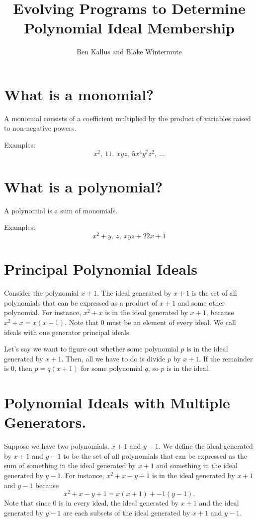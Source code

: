 \documentclass[20pt]{extarticle}
\title{Evolving Programs to Determine Polynomial Ideal Membership}
\author{Ben Kallus and Blake Wintermute}
\date{ }
\begin{document}
\pagecolor{black}
\color{white}
\maketitle

\newpage
\section*{What is a monomial?}

    A monomial consists of a coefficient multiplied by the product of variables raised to non-negative powers.

    Examples: $$x^2,~ 11,~ xyz,~ 5x^4y^7z^2,~ \hdots$$

\newpage
\section*{What is a polynomial?}

    A polynomial is a sum of monomials.

    Examples: $$x^2 + y,~ z,~ xyz + 22x + 1$$

\newpage
\section*{Principal Polynomial Ideals}

    Consider the polynomial $x+1$.
    The ideal generated by $x+1$ is the set of all polynomials that can be expressed as a product of $x+1$ and some other polynomial.
    For instance, $x^2+x$ is in the ideal generated by $x+1$, because $x^2 + x = x(x+1)$.
    Note that 0 must be an element of every ideal.
    We call ideals with one generator principal ideals.

    Let's say we want to figure out whether some polynomial $p$ is in the ideal generated by $x+1$.
    Then, all we have to do is divide $p$ by $x+1$.
    If the remainder is 0, then $p = q(x+1)$ for some polynomial $q$, so $p$ is in the ideal.

\newpage
\section*{Polynomial Ideals with Multiple Generators.}
    Suppose we have two polynomials, $x+1$ and $y-1$.
    We define the ideal generated by $x+1$ and $y-1$ to be the set of all polynomials that can be expressed as the sum of something in the ideal generated by $x+1$ and something in the ideal generated by $y-1$.
    For instance, $x^2+x-y+1$ is in the ideal generated by $x+1$ and $y-1$ because $$x^2+x-y+1 = x(x+1) + -1(y-1).$$
    Note that since 0 is in every ideal, the ideal generated by $x+1$ and the ideal generated by $y-1$ are each subsets of the ideal generated by $x+1$ and $y-1$.
\end{document}
